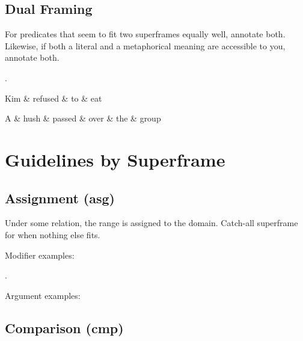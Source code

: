 \documentclass[a4paper]{article}
\begin{document}
\subsection{Dual Framing}

For predicates that seem to fit two superframes equally well, annotate both. Likewise, if both a literal and a metaphorical meaning are accessible to you, annotate both.

\ex.
\begin{dependency}
    \begin{deptext}
        Kim \& refused \& to \& eat \\
    \end{deptext}
\end{dependency}
\begin{dependency}
    \begin{deptext}
        A \& hush \& passed \& over \& the \& group \\
    \end{deptext}
\end{dependency}

\section{Guidelines by Superframe}


\subsection{Assignment (asg)}

Under some relation, the range is assigned to the domain. Catch-all superframe for when nothing else fits.

Modifier examples:

\ex. 

Argument examples:

\subsection{Comparison (cmp)}
\end{document}
